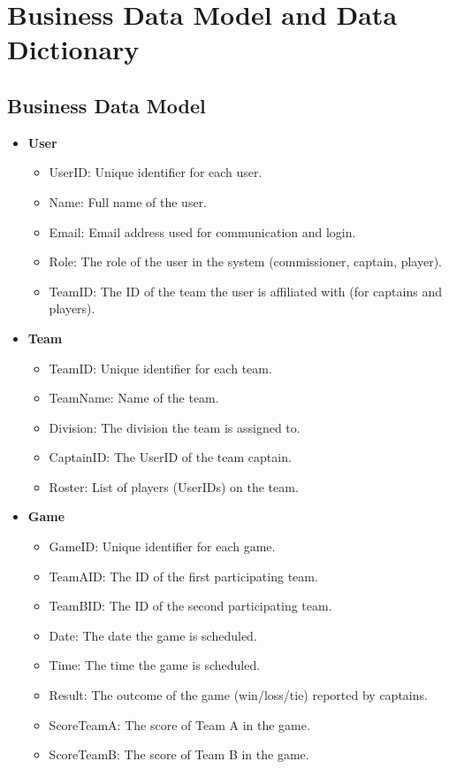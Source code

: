 \documentclass[12pt, titlepage]{article}
\begin{document}
\section{Business Data Model and Data Dictionary}
\subsection{Business Data Model}
\begin{itemize}
    \item \textbf{User}
    \begin{itemize}
        \item UserID: Unique identifier for each user.
        \item Name: Full name of the user.
        \item Email: Email address used for communication and login.
        \item Role: The role of the user in the system (commissioner, captain, player).
        \item TeamID: The ID of the team the user is affiliated with (for captains and players).
    \end{itemize}
    
    \item \textbf{Team}
    \begin{itemize}
        \item TeamID: Unique identifier for each team.
        \item TeamName: Name of the team.
        \item Division: The division the team is assigned to.
        \item CaptainID: The UserID of the team captain.
        \item Roster: List of players (UserIDs) on the team.
    \end{itemize}
    
    \item \textbf{Game}
    \begin{itemize}
        \item GameID: Unique identifier for each game.
        \item TeamAID: The ID of the first participating team.
        \item TeamBID: The ID of the second participating team.
        \item Date: The date the game is scheduled.
        \item Time: The time the game is scheduled.
        \item Result: The outcome of the game (win/loss/tie) reported by captains.
        \item ScoreTeamA: The score of Team A in the game.
        \item ScoreTeamB: The score of Team B in the game.
    \end{itemize}
    

\end{itemize}
\end{document}

